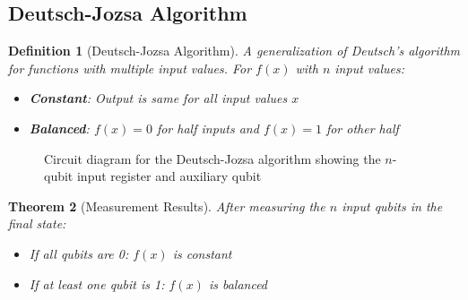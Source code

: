 \documentclass{article}
\newtheorem{theorem}{Theorem}[subsection]
\newtheorem{definition}[theorem]{Definition}
\begin{document}
\subsection{Deutsch-Jozsa Algorithm}
\begin{definition}[Deutsch-Jozsa Algorithm]
A generalization of Deutsch's algorithm for functions with multiple input values. For $f(x)$ with $n$ input values:
\begin{itemize}
    \item \textbf{Constant}: Output is same for all input values $x$
    \item \textbf{Balanced}: $f(x) = 0$ for half inputs and $f(x) = 1$ for other half
\end{itemize}
\end{definition}

\begin{figure}[h]
    \centering
    \caption{Circuit diagram for the Deutsch-Jozsa algorithm showing the $n$-qubit input register and auxiliary qubit}
\end{figure}

\begin{theorem}[Measurement Results]
After measuring the $n$ input qubits in the final state:
\begin{itemize}
    \item If all qubits are 0: $f(x)$ is constant
    \item If at least one qubit is 1: $f(x)$ is balanced
\end{itemize}
\end{theorem}
\end{document}
